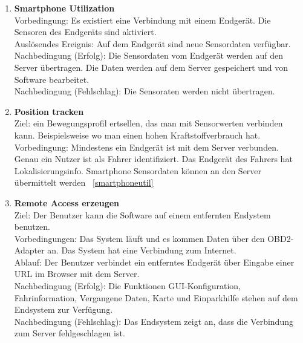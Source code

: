 \documentclass[pflichtenheft.tex]{subfiles}
\begin{document}
\begin{enumerate}
		\item{\textbf{Smartphone Utilization}} \label{smartphoneutil} \\ Vorbedingung: Es existiert eine Verbindung mit einem Endgerät. Die Sensoren des Endgeräts sind aktiviert.\\ Auslösendes Ereignis: Auf dem Endgerät sind neue Sensordaten verfügbar. \\ Nachbedingung (Erfolg): Die Sensordaten vom Endgerät werden auf den Server übertragen. Die Daten werden auf dem Server gespeichert und von Software bearbeitet.\\  Nachbedingung (Fehlschlag): Die Sensoraten werden nicht übertragen.

	

		\item{\textbf{Position tracken}} \\Ziel: ein Bewegungsprofil ertsellen, das man mit Sensorwerten verbinden kann. Beispielsweise wo man einen hohen Kraftstoffverbrauch hat. \\Vorbedingung: Mindestens ein Endgerät ist mit dem Server verbunden. Genau ein Nutzer ist als Fahrer identifiziert. Das Endgerät des Fahrers hat Lokalisierungsinfo. Smartphone Sensordaten können an den Server übermittelt werden ~\ref{smartphoneutil}

		\renewcommand{\theenumi}{/FA\ifnum \value{enumi}<10 0\fi\arabic{enumi}0/}
		\renewcommand{\labelenumi}{\theenumi}
		\renewcommand{\theenumii}{\arabic{enumii}}
		\renewcommand{\labelenumii}{/FA\ifnum \value{enumi}<10 0\fi\arabic{enumi}\arabic{enumii}/}
		
		\item{\textbf{Remote Access erzeugen}} \label{remote} \\ Ziel: Der Benutzer kann die Software auf einem entfernten Endystem benutzen.\\ Vorbedingungen: Das System läuft und es kommen Daten über den OBD2-Adapter an. Das System hat eine Verbindung zum Internet. \\ Ablauf: Der Benutzer verbindet ein entferntes Endgerät über Eingabe einer URL im Browser mit dem Server.\\ Nachbedingung (Erfolg): Die Funktionen GUI-Konfiguration, Fahrinformation, Vergangene Daten, Karte und Einparkhilfe stehen auf dem Endsystem zur Verfügung. \\ Nachbedingung (Fehlschlag): Das Endsystem zeigt an, dass die Verbindung zum Server fehlgeschlagen ist.
		\setcounter{enumTemp}{\value{enumi}}
	\end{enumerate} 
\end{document}

